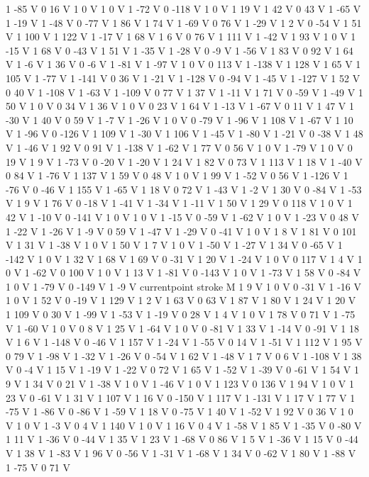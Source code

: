 {{1 -85 V
0 16 V
1 0 V
1 0 V
1 -72 V
0 -118 V
1 0 V
1 19 V
1 42 V
0 43 V
1 -65 V
1 -19 V
1 -48 V
0 -77 V
1 86 V
1 74 V
1 -69 V
0 76 V
1 -29 V
1 2 V
0 -54 V
1 51 V
1 100 V
1 122 V
1 -17 V
1 68 V
1 6 V
0 76 V
1 111 V
1 -42 V
1 93 V
1 0 V
1 -15 V
1 68 V
0 -43 V
1 51 V
1 -35 V
1 -28 V
0 -9 V
1 -56 V
1 83 V
0 92 V
1 64 V
1 -6 V
1 36 V
0 -6 V
1 -81 V
1 -97 V
1 0 V
0 113 V
1 -138 V
1 128 V
1 65 V
1 105 V
1 -77 V
1 -141 V
0 36 V
1 -21 V
1 -128 V
0 -94 V
1 -45 V
1 -127 V
1 52 V
0 40 V
1 -108 V
1 -63 V
1 -109 V
0 77 V
1 37 V
1 -11 V
1 71 V
0 -59 V
1 -49 V
1 50 V
1 0 V
0 34 V
1 36 V
1 0 V
0 23 V
1 64 V
1 -13 V
1 -67 V
0 11 V
1 47 V
1 -30 V
1 40 V
0 59 V
1 -7 V
1 -26 V
1 0 V
0 -79 V
1 -96 V
1 108 V
1 -67 V
1 10 V
1 -96 V
0 -126 V
1 109 V
1 -30 V
1 106 V
1 -45 V
1 -80 V
1 -21 V
0 -38 V
1 48 V
1 -46 V
1 92 V
0 91 V
1 -138 V
1 -62 V
1 77 V
0 56 V
1 0 V
1 -79 V
1 0 V
0 19 V
1 9 V
1 -73 V
0 -20 V
1 -20 V
1 24 V
1 82 V
0 73 V
1 113 V
1 18 V
1 -40 V
0 84 V
1 -76 V
1 137 V
1 59 V
0 48 V
1 0 V
1 99 V
1 -52 V
0 56 V
1 -126 V
1 -76 V
0 -46 V
1 155 V
1 -65 V
1 18 V
0 72 V
1 -43 V
1 -2 V
1 30 V
0 -84 V
1 -53 V
1 9 V
1 76 V
0 -18 V
1 -41 V
1 -34 V
1 -11 V
1 50 V
1 29 V
0 118 V
1 0 V
1 42 V
1 -10 V
0 -141 V
1 0 V
1 0 V
1 -15 V
0 -59 V
1 -62 V
1 0 V
1 -23 V
0 48 V
1 -22 V
1 -26 V
1 -9 V
0 59 V
1 -47 V
1 -29 V
0 -41 V
1 0 V
1 8 V
1 81 V
0 101 V
1 31 V
1 -38 V
1 0 V
1 50 V
1 7 V
1 0 V
1 -50 V
1 -27 V
1 34 V
0 -65 V
1 -142 V
1 0 V
1 32 V
1 68 V
1 69 V
0 -31 V
1 20 V
1 -24 V
1 0 V
0 117 V
1 4 V
1 0 V
1 -62 V
0 100 V
1 0 V
1 13 V
1 -81 V
0 -143 V
1 0 V
1 -73 V
1 58 V
0 -84 V
1 0 V
1 -79 V
0 -149 V
1 -9 V
currentpoint stroke M
1 9 V
1 0 V
0 -31 V
1 -16 V
1 0 V
1 52 V
0 -19 V
1 129 V
1 2 V
1 63 V
0 63 V
1 87 V
1 80 V
1 24 V
1 20 V
1 109 V
0 30 V
1 -99 V
1 -53 V
1 -19 V
0 28 V
1 4 V
1 0 V
1 78 V
0 71 V
1 -75 V
1 -60 V
1 0 V
0 8 V
1 25 V
1 -64 V
1 0 V
0 -81 V
1 33 V
1 -14 V
0 -91 V
1 18 V
1 6 V
1 -148 V
0 -46 V
1 157 V
1 -24 V
1 -55 V
0 14 V
1 -51 V
1 112 V
1 95 V
0 79 V
1 -98 V
1 -32 V
1 -26 V
0 -54 V
1 62 V
1 -48 V
1 7 V
0 6 V
1 -108 V
1 38 V
0 -4 V
1 15 V
1 -19 V
1 -22 V
0 72 V
1 65 V
1 -52 V
1 -39 V
0 -61 V
1 54 V
1 9 V
1 34 V
0 21 V
1 -38 V
1 0 V
1 -46 V
1 0 V
1 123 V
0 136 V
1 94 V
1 0 V
1 23 V
0 -61 V
1 31 V
1 107 V
1 16 V
0 -150 V
1 117 V
1 -131 V
1 17 V
1 77 V
1 -75 V
1 -86 V
0 -86 V
1 -59 V
1 18 V
0 -75 V
1 40 V
1 -52 V
1 92 V
0 36 V
1 0 V
1 0 V
1 -3 V
0 4 V
1 140 V
1 0 V
1 16 V
0 4 V
1 -58 V
1 85 V
1 -35 V
0 -80 V
1 11 V
1 -36 V
0 -44 V
1 35 V
1 23 V
1 -68 V
0 86 V
1 5 V
1 -36 V
1 15 V
0 -44 V
1 38 V
1 -83 V
1 96 V
0 -56 V
1 -31 V
1 -68 V
1 34 V
0 -62 V
1 80 V
1 -88 V
1 -75 V
0 71 V
}}
